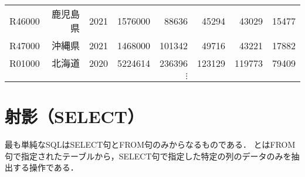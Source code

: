 \begin{table}[tb]
{\begin{tabular}{@{}rrrrrrrr@{}}
    R46000 & 鹿児島県 & 2021 & 1576000  & 88636  & 45294  & 43029  & 15477  \\
    R47000 & 沖縄県  & 2021 & 1468000  & 101342 & 49716  & 43221  & 17882  \\
    R01000 & 北海道  & 2020 & 5224614  & 236396 & 123129 & 119773 & 79409 \\
           &        &      &          & $\vdots$  &        &        &       \\ \bottomrule
    \end{tabular}
    }
    \label{tab:population-table}
\end{table}

\section{射影（SELECT）}
最も単純なSQLはSELECT句とFROM句のみからなるものである． とはFROM句で指定されたテーブルから，SELECT句で指定した特定の列のデータのみを抽出する操作である．

